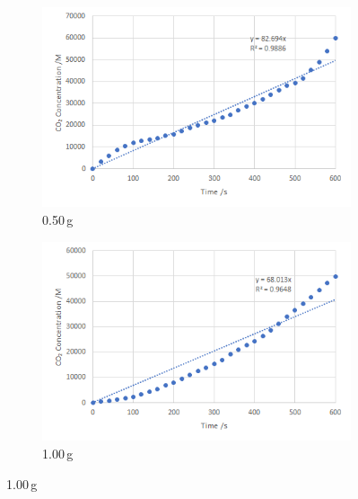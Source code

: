 \documentclass{article}
\begin{document}
\begin{figure}[H]
\begin{subfigure}{0.49\linewidth}
        \includegraphics[width=\linewidth]{figures/appendix/appendix2_0.50_trial2.png}
        \vspace*{-18pt}
        \caption{0.50\,\si{g}}
    \end{subfigure}
    \begin{subfigure}{0.49\linewidth}
        \includegraphics[width=\linewidth]{figures/appendix/appendix2_1.00_trial2.png}
        \vspace*{-18pt}
        \caption{1.00\,\si{g}}
    \end{subfigure}
\end{figure}
\end{document}

